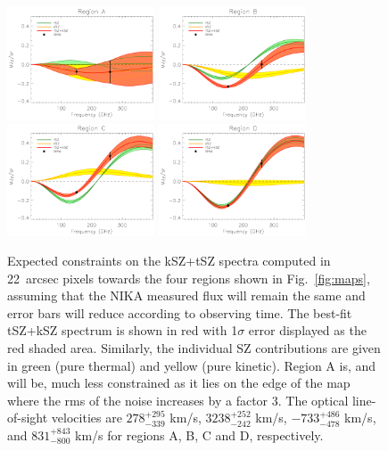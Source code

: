\documentclass[11pt,a4paper,twoside,graphicx,color]{article}
\begin{document}
\begin{figure}[h!]
	\centering
	\includegraphics[width=0.39\textwidth]{SZspecA.pdf}
	\includegraphics[width=0.39\textwidth]{SZspecB.pdf}
	\includegraphics[width=0.39\textwidth]{SZspecC.pdf}
	\includegraphics[width=0.39\textwidth]{SZspecD.pdf}
	\caption{Expected constraints on the kSZ+tSZ spectra computed in 22~arcsec pixels towards the four regions shown in Fig.~\ref{fig:maps}, assuming that the NIKA measured flux will remain the same and error bars will reduce according to observing time. The best-fit tSZ+kSZ spectrum is shown in red with 1$\sigma$ error displayed as the red shaded area. Similarly, the individual SZ contributions are given in green (pure thermal) and yellow (pure kinetic). Region A is, and will be, much less constrained as it lies on the edge of the map where the rms of the noise increases by a factor 3. The optical line-of-sight velocities \citep{ma2009} are $278^{+295}_{-339}$ km/s, $3238^{+252}_{-242}$ km/s, $-733^{+486}_{-478}$ km/s, and $831^{+843}_{-800}$ km/s for regions A, B, C and D, respectively.}
	\label{fig:spectra}
\end{figure}
\end{document}
